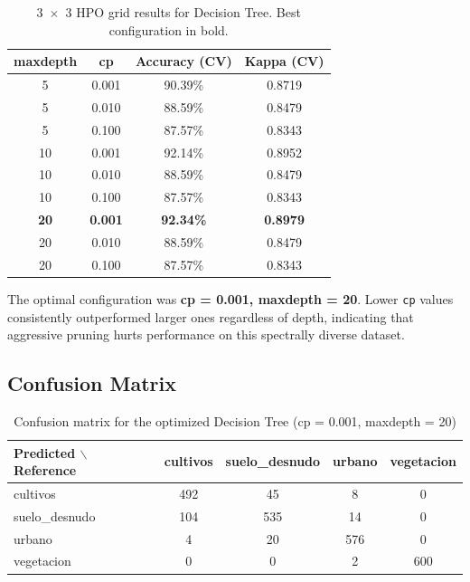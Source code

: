 \documentclass[12pt,a4paper]{article}
\begin{document}
\begin{table}[H]
\centering
\begin{tabular}{|c|c|c|c|}
\hline
\textbf{maxdepth} & \textbf{cp} & \textbf{Accuracy (CV)} & \textbf{Kappa (CV)} \\
\hline
 5 & 0.001 & 90.39\% & 0.8719 \\
 5 & 0.010 & 88.59\% & 0.8479 \\
 5 & 0.100 & 87.57\% & 0.8343 \\
10 & 0.001 & 92.14\% & 0.8952 \\
10 & 0.010 & 88.59\% & 0.8479 \\
10 & 0.100 & 87.57\% & 0.8343 \\
\textbf{20} & \textbf{0.001} & \textbf{92.34\%} & \textbf{0.8979} \\
20 & 0.010 & 88.59\% & 0.8479 \\
20 & 0.100 & 87.57\% & 0.8343 \\
\hline
\end{tabular}
\caption{3~$\times$~3 HPO grid results for Decision Tree. Best configuration in bold.}
\end{table}

The optimal configuration was \textbf{cp = 0.001, maxdepth = 20}. Lower \texttt{cp} values consistently outperformed larger ones regardless of depth, indicating that aggressive pruning hurts performance on this spectrally diverse dataset.

\subsection{Confusion Matrix}

\begin{table}[H]
\centering
\begin{tabular}{|l|c|c|c|c|}
\hline
\textbf{Predicted $\backslash$ Reference} & \textbf{cultivos} & \textbf{suelo\_desnudo} & \textbf{urbano} & \textbf{vegetacion} \\
\hline
cultivos       & 492 &  45 &  8 &   0 \\
\hline
suelo\_desnudo & 104 & 535 & 14 &   0 \\
\hline
urbano         &   4 &  20 & 576 &  0 \\
\hline
vegetacion     &   0 &   0 &  2 & 600 \\
\hline
\end{tabular}
\caption{Confusion matrix for the optimized Decision Tree (cp = 0.001, maxdepth = 20)}
\end{table}
\end{document}
